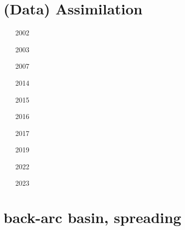 \section{(Data) Assimilation}

\begin{small}
\begin{itemize}
\item[2002]
\item[2003]
\item[2007]
\item[2014]
\item[2015]
\item[2016]
\item[2017]
\item[2019]
\item[2022]
\item[2023]
\end{itemize}
\end{small}



\section{back-arc basin, spreading}

